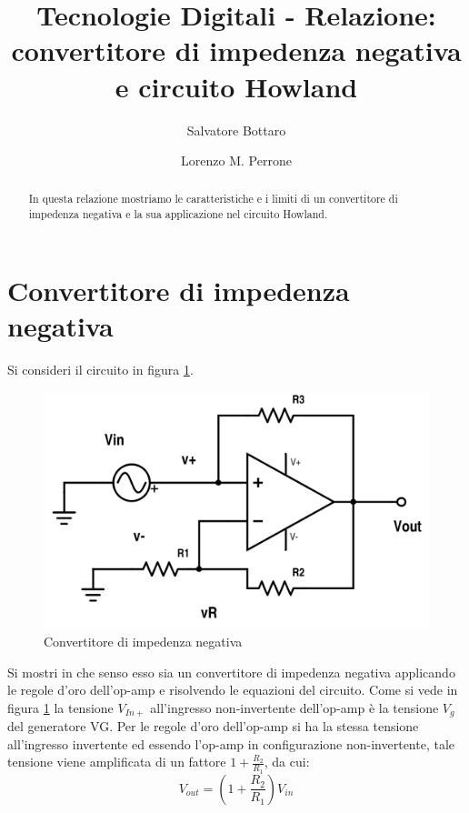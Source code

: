 \documentclass[journal, a4paper]{IEEEtran}
\begin{document}
	\title{Tecnologie Digitali - Relazione: convertitore di impedenza negativa e circuito Howland}
	\author[1]{Salvatore Bottaro}
		\author[2]{Lorenzo M. Perrone}
	\maketitle

\begin{abstract}
In questa relazione mostriamo le caratteristiche e i limiti di un convertitore di impedenza negativa e la sua applicazione nel circuito Howland.
\end{abstract}

\section{Convertitore di impedenza negativa}
Si consideri il circuito in figura \ref{fig:negimp}.

\begin{figure}[htp]
\centering
\includegraphics[scale=.2]{conv-imp-neg}
\caption{Convertitore di impedenza negativa}
\label{fig:negimp}
\end{figure}

Si mostri in che senso esso sia un convertitore di impedenza negativa applicando le regole d'oro dell'op-amp e risolvendo le equazioni del circuito. Come si vede in figura \ref{fig:negimp} la tensione $V_{In+}$ all'ingresso non-invertente dell'op-amp è la tensione $V_g$ del generatore VG. Per le regole d'oro dell'op-amp si ha la stessa tensione all'ingresso invertente ed essendo l'op-amp in configurazione non-invertente, tale tensione viene amplificata di un fattore $1+\frac{R_2}{R_1}$, da cui:
\begin{equation}
V_{out} = (1+\frac{R_2}{R_1})V_{in}
\label{eqn:amp}
\end{equation}
\end{document}
